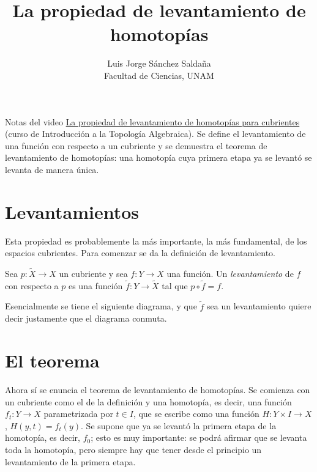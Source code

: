 \documentclass[11pt]{article}
\title{La propiedad de levantamiento de homotopías}
\author{Luis Jorge Sánchez Saldaña\\[2pt]\small Facultad de Ciencias, UNAM}
\date{}
\begin{document}
\maketitle

\noindent\small Notas del video
\href{https://www.youtube.com/watch?v=gurE_L4nTK8}{\guillemotleft{}La propiedad de levantamiento de homotopías para cubrientes\guillemotright{}}
(curso de Introducción a la Topología Algebraica). Se define el levantamiento de una función con respecto a un cubriente y se demuestra el teorema de levantamiento de homotopías: una homotopía cuya primera etapa ya se levantó se levanta de manera única.
\normalsize

\section*{Levantamientos}

Esta propiedad es probablemente la más importante, la más fundamental, de los espacios cubrientes. Para comenzar se da la definición de levantamiento.

\begin{defn}[Levantamiento]\label{defn:levantamiento}
Sea $p\colon\tilde X\to X$ un cubriente y sea $f\colon Y\to X$ una función. Un \emph{levantamiento} de $f$ con respecto a $p$ es una función $\tilde f\colon Y\to\tilde X$ tal que $p\circ\tilde f=f$.
\end{defn}

Esencialmente se tiene el siguiente diagrama, y que $\tilde f$ sea un levantamiento quiere decir justamente que el diagrama conmuta.

\begin{center}
\end{center}

\section*{El teorema}

Ahora sí se enuncia el teorema de levantamiento de homotopías. Se comienza con un cubriente como el de la definición y una homotopía, es decir, una función $f_t\colon Y\to X$ parametrizada por $t\in I$, que se escribe como una función $H\colon Y\times I\to X$, $H(y,t)=f_t(y)$. Se supone que ya se levantó la primera etapa de la homotopía, es decir, $f_0$; esto es muy importante: se podrá afirmar que se levanta toda la homotopía, pero siempre hay que tener desde el principio un levantamiento de la primera etapa.
\end{document}
